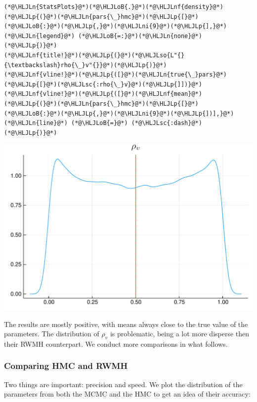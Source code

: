 \documentclass[12pt,a4paper]{article}
\newcommand{\HLJLn}[1]{#1}
\newcommand{\HLJLnf}[1]{\textcolor[RGB]{66,102,213}{#1}}
\newcommand{\HLJLsc}[1]{\textcolor[RGB]{201,61,57}{#1}}
\newcommand{\HLJLso}[1]{\textcolor[RGB]{201,61,57}{#1}}
\newcommand{\HLJLni}[1]{\textcolor[RGB]{59,151,46}{#1}}
\newcommand{\HLJLoB}[1]{\textcolor[RGB]{102,102,102}{\textbf{#1}}}
\newcommand{\HLJLp}[1]{#1}
\begin{document}
\begin{lstlisting}
(*@\HLJLn{StatsPlots}@*)(*@\HLJLoB{.}@*)(*@\HLJLnf{density}@*)(*@\HLJLp{(}@*)(*@\HLJLn{pars{\_}hmc}@*)(*@\HLJLp{[}@*)(*@\HLJLoB{:}@*)(*@\HLJLp{,}@*)(*@\HLJLni{9}@*)(*@\HLJLp{],}@*) (*@\HLJLn{legend}@*) (*@\HLJLoB{=:}@*)(*@\HLJLn{none}@*)(*@\HLJLp{)}@*)
(*@\HLJLnf{title!}@*)(*@\HLJLp{(}@*)(*@\HLJLso{L"{}{\textbackslash}rho{\_}v"{}}@*)(*@\HLJLp{)}@*)
(*@\HLJLnf{vline!}@*)(*@\HLJLp{([}@*)(*@\HLJLn{true{\_}pars}@*)(*@\HLJLp{[}@*)(*@\HLJLsc{:rho{\_}v}@*)(*@\HLJLp{]])}@*)
(*@\HLJLnf{vline!}@*)(*@\HLJLp{([}@*)(*@\HLJLnf{mean}@*)(*@\HLJLp{(}@*)(*@\HLJLn{pars{\_}hmc}@*)(*@\HLJLp{[}@*)(*@\HLJLoB{:}@*)(*@\HLJLp{,}@*)(*@\HLJLni{9}@*)(*@\HLJLp{])],}@*) (*@\HLJLn{line}@*) (*@\HLJLoB{=}@*) (*@\HLJLsc{:dash}@*)(*@\HLJLp{)}@*)
\end{lstlisting}

\includegraphics[width=\linewidth]{figures/dsge_and_julia_43_1.pdf}

The results are mostly positive, with means always close to the true value of the parameters. The distribution of $\rho_v$ is problematic, being a lot more disperse then their RWMH counterpart. We conduct more comparisons in what follows.

\subsubsection{Comparing HMC and RWMH}
Two things are important: precision and speed. We plot the distribution of the parameters from both the MCMC and the HMC to get an idea of their accuracy:
\end{document}
